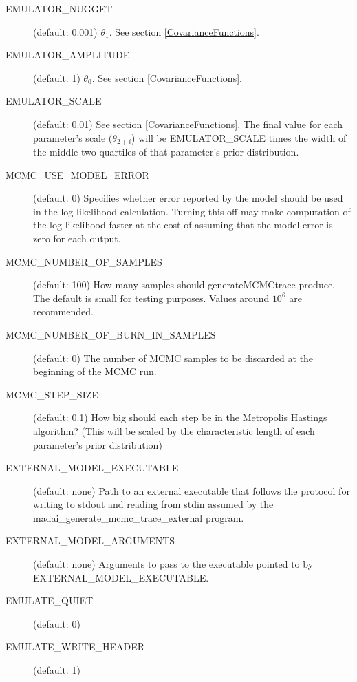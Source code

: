 \begin{description}
    \item[EMULATOR\_NUGGET] (default: 0.001) $\theta_1$. See section \ref{CovarianceFunctions}.
    \item[EMULATOR\_AMPLITUDE] (default: 1) $\theta_0$. See section \ref{CovarianceFunctions}.
    \item[EMULATOR\_SCALE] (default: 0.01) See section \ref{CovarianceFunctions}. The final value for each parameter's scale ($\theta_{2+i}$) will be EMULATOR\_SCALE times the width of the middle two quartiles of that parameter's prior distribution.
    \item[MCMC\_USE\_MODEL\_ERROR] (default: 0) Specifies whether error reported by the model should be used in the log likelihood calculation. Turning this off may make computation of the log likelihood faster at the cost of assuming that the model error is zero for each output.
    \item[MCMC\_NUMBER\_OF\_SAMPLES] (default: 100) How many samples should generateMCMCtrace produce. The default is small for testing purposes. Values around $10^6$ are recommended.
    \item[MCMC\_NUMBER\_OF\_BURN\_IN\_SAMPLES] (default: 0) The number of MCMC samples to be discarded at the beginning of the MCMC run.
    \item[MCMC\_STEP\_SIZE] (default: 0.1) How big should each step be in the Metropolis Hastings algorithm? (This will be scaled by the characteristic length of each parameter's prior distribution)
    \item[EXTERNAL\_MODEL\_EXECUTABLE] (default: none) Path to an external executable that follows the protocol for writing to stdout and reading from stdin assumed by the madai\_generate\_mcmc\_trace\_external program.
    \item[EXTERNAL\_MODEL\_ARGUMENTS] (default: none) Arguments to pass to the executable pointed to by EXTERNAL\_MODEL\_EXECUTABLE.
    \item[EMULATE\_QUIET] (default: 0)
    \item[EMULATE\_WRITE\_HEADER] (default: 1)
\end{description}

